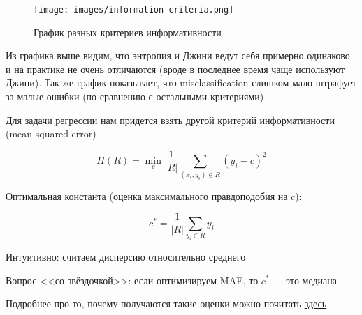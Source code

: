 \begin{figure}[H]

\centering

\texttt{[image: images/information criteria.png]}

\caption{График разных критериев информативности}

\end{figure}

Из графика выше видим, что энтропия и Джини ведут себя примерно одинаково и на практике не очень отличаются (вроде в последнее время чаще используют Джини). Так же график показывает, что misclassification слишком мало штрафует за малые ошибки (по сравнению с остальными критериями)

Для задачи регрессии нам придется взять другой критерий информативности (mean squared error)

\[ H(R) = \min_c \frac 1 {|R|} \sum_{(x_i, y_i) \in R} (y_i - c)^2\]

Оптимальная константа (оценка максимального правдоподобия на $c$): 

\[ c^*=\frac 1 {|R|} \sum_{y_i \in R} y_i \]

Интуитивно: считаем дисперсию относительно среднего

Вопрос <<со звёздочкой>>: если оптимизируем MAE, то $c^*$ --- это медиана

Подробнее про то, почему получаются такие оценки можно почитать \href{https://d18ky98rnyall9.cloudfront.net/rpPnDwIOSFaT5w8CDnhWWA_44e3f19ed9fd4e56baa1c8ce9ba064b5_loss_functions.pdf?Expires=1673308800&Signature=Bpev8rp2H1yc4cLEgoHJVJyO~3J-4z0SR9hTDea8xAZfKECVNgdr7bG~N33xj71vSyGs8jOkXWwZKRw-q2x5wTxxQDPsiV7K71MAItbktK83ranmPjApYcBipi9rimYRQAoLwKOBZr5RtF0DEiF7FXr5HaBuh4KXCQMnOYSqoFs_&Key-Pair-Id=APKAJLTNE6QMUY6HBC5A}{здесь} 
